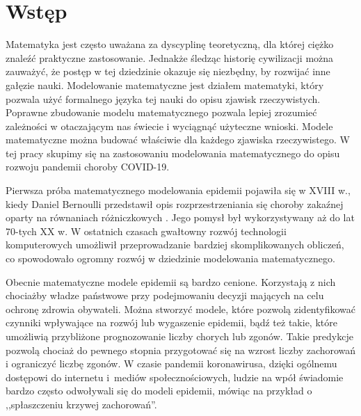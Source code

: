 \documentclass[12pt]{mwbk}
\theoremstyle{plain}
\theoremstyle{definition}
\theoremstyle{definition}
\begin{document}



\tableofcontents


\chapter*{Wstęp}


Matematyka jest często uważana za dyscyplinę teoretyczną, dla której ciężko znaleźć praktyczne zastosowanie. Jednakże śledząc historię cywilizacji można zauważyć, że postęp w tej dziedzinie okazuje się niezbędny, by rozwijać inne gałęzie nauki. Modelowanie matematyczne jest działem matematyki, który pozwala użyć formalnego języka tej nauki do opisu zjawisk rzeczywistych. Poprawne zbudowanie modelu matematycznego pozwala lepiej zrozumieć zależności w otaczającym nas świecie i wyciągnąć użyteczne wnioski. Modele matematyczne można budować właściwie dla każdego zjawiska rzeczywistego. W tej pracy skupimy się na zastosowaniu modelowania matematycznego do opisu rozwoju pandemii choroby COVID-19.

Pierwsza próba matematycznego modelowania epidemii pojawiła się w XVIII w., kiedy Daniel Bernoulli przedstawił opis rozprzestrzeniania się choroby zakaźnej oparty na równaniach różniczkowych \cite{epidemie}. Jego pomysł był wykorzystywany aż do lat 70-tych XX w. W ostatnich czasach gwałtowny rozwój technologii komputerowych umożliwił przeprowadzanie bardziej skomplikowanych obliczeń, co spowodowało ogromny rozwój w dziedzinie modelowania matematycznego. 

Obecnie matematyczne modele epidemii są bardzo cenione. Korzystają z nich chociażby władze państwowe przy podejmowaniu decyzji mających na celu ochronę zdrowia obywateli. Można stworzyć modele, które pozwolą zidentyfikować czynniki wpływające na rozwój lub wygaszenie epidemii, bądź też takie, które umożliwią przybliżone prognozowanie liczby chorych lub zgonów. Takie predykcje pozwolą chociaż do pewnego stopnia przygotować się na wzrost liczby zachorowań i ograniczyć liczbę zgonów. W czasie pandemii koronawirusa, dzięki ogólnemu dostępowi do internetu i~mediów społecznościowych, ludzie na wpół świadomie bardzo często odwoływali się do modeli epidemii, mówiąc na przykład o ,,spłaszczeniu krzywej zachorowań''.
\end{document}
